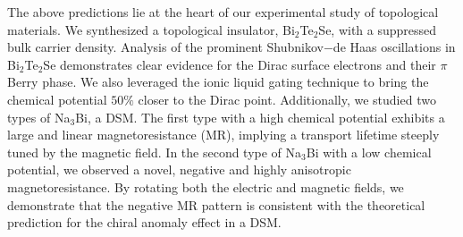 The above predictions lie at the heart of our experimental study of topological materials. We synthesized a topological insulator, Bi$_2$Te$_2$Se, with a suppressed bulk carrier density. Analysis of the prominent Shubnikov$-$de Haas oscillations in Bi$_2$Te$_2$Se demonstrates clear evidence for the Dirac surface electrons and their $\pi$ Berry phase. We also leveraged the ionic liquid gating technique to bring the chemical potential $50 \%$ closer to the Dirac point. Additionally, we studied two types of Na$_3$Bi, a DSM. The first type with a high chemical potential exhibits a large and linear magnetoresistance (MR), implying a transport lifetime steeply tuned by the magnetic field. In the second type of Na$_3$Bi with a low chemical potential, we observed a novel, negative and highly anisotropic magnetoresistance. By rotating both the electric and magnetic fields, we demonstrate that the negative MR pattern is consistent with the theoretical prediction for the chiral anomaly effect in a DSM. 